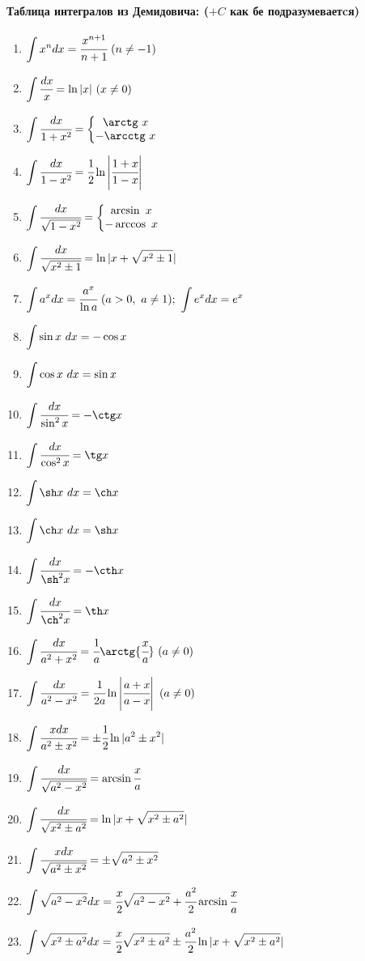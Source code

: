 \documentclass[a4]{report}
\renewcommand{\int}{\displaystyle\intop}
\begin{document}
\paragraph{Таблица интегралов из Демидовича: ($+C$ как бе подразумеваетcя)}
\begin{enumerate}
\item$\int x^ndx                          = \cfrac{x^{n+1}}{n+1}\ (n\neq-1)$
\item$\int \cfrac{dx}{x}                  = \ln|x|\ (x\neq0)$
\item$\int \cfrac{dx}{1+x^2}              = \left\{ \begin{matrix}\arctg\ x&\\-\arcctg\ x&\end{matrix}\right.$
\item$\int \cfrac{dx}{1-x^2}              = \cfrac12\ln\left|\cfrac{1+x}{1-x}\right|$
\item$\int \cfrac{dx}{\sqrt{1-x^2}}       = \left\{ \begin{matrix}\arcsin\ x&\\-\arccos\ x&\end{matrix}\right.$
\item$\int \cfrac{dx}{\sqrt{x^2\pm1}}     = \ln|x+\sqrt{x^2\pm1}|$
\item$\int a^xdx                          = \cfrac{a^x}{\ln a}\ (a>0,\ a\neq1);\ \int e^xdx=e^x$
\item$\int \sin x\ dx                     = -\cos x$
\item$\int \cos x\ dx                     = \sin x$
\item$\int \cfrac{dx}{\sin^2x}            = -\ctg x$
\item$\int \cfrac{dx}{\cos^2x}            = \tg x$
\item$\int \sh x\ dx                      = \ch x$
\item$\int \ch x\ dx                      = \sh x$
\item$\int \cfrac{dx}{\sh^2x}             = -\cth x$
\item$\int \cfrac{dx}{\ch^2x}             = \th x$
\item$\int \cfrac{dx}{a^2+x^2}            = \cfrac1a\arctg{\cfrac xa}\ (a\neq0)$
\item$\int \cfrac{dx}{a^2-x^2}            = \cfrac1{2a}\ln\left|\cfrac{a+x}{a-x}\right|\ (a\neq0)$
\item$\int \cfrac{xdx}{a^2\pm x^2}        = \pm\cfrac12\ln|a^2\pm x^2|$
\item$\int \cfrac{dx}{\sqrt{a^2-x^2}}     = \arcsin\cfrac xa$
\item$\int \cfrac{dx}{\sqrt{x^2\pm a^2}}  = \ln|x+\sqrt{x^2\pm a^2}|$
\item$\int \cfrac{xdx}{\sqrt{a^2\pm x^2}} = \pm\sqrt{a^2\pm x^2}$
\item$\int \sqrt{a^2-x^2}dx               = \cfrac x2\sqrt{a^2-x^2}+\cfrac{a^2}2\arcsin\cfrac xa$
\item$\int \sqrt{x^2\pm a^2}dx            = \cfrac x2\sqrt{x^2\pm a^2}\pm\cfrac{a^2}2\ln|x+\sqrt{x^2\pm a^2}|$
\end{enumerate}
\end{document}

